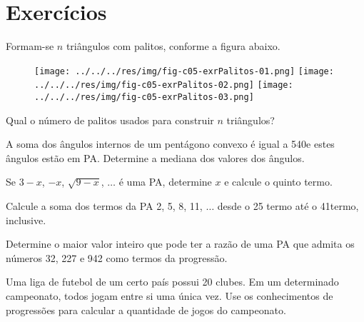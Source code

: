 \section{Exercícios}

\begin{exercise}
    Formam-se $n$ triângulos com palitos, conforme a figura abaixo.
\begin{center}

\begin{figure}[H]
    \center
    \texttt{[image: ../../../res/img/fig-c05-exrPalitos-01.png]}
    \texttt{[image: ../../../res/img/fig-c05-exrPalitos-02.png]}
    \texttt{[image: ../../../res/img/fig-c05-exrPalitos-03.png]}
\end{figure}

\end{center}
Qual o número de palitos usados para construir $n$ triângulos? 
\end{exercise}

\begin{exercise}
    A soma dos ângulos internos de um pentágono convexo é igual a
540\tdeg e estes ângulos estão em PA. Determine a mediana dos valores
dos ângulos.
\end{exercise}

\begin{exercise}
    Se $3-x$, $-x$, $\sqrt{9-x}$, $\dots$ é uma PA, determine $x$ e
calcule o quinto termo.
\end{exercise}

\begin{exercise}
    Calcule a soma dos termos da PA 2, 5, 8, 11, $\dots$ desde o 25\tdeg
termo até o 41\tdeg termo, inclusive.
\end{exercise}

\begin{exercise}
    Determine o maior valor inteiro que pode ter a razão de uma PA
que admita os números 32, 227 e 942 como termos da progressão.
\end{exercise}

\begin{exercise}
    Uma liga de futebol de um certo país possui 20 clubes. Em um determinado campeonato, todos jogam entre si uma única vez. Use os conhecimentos de progressões para calcular a quantidade de jogos do campeonato.
\end{exercise}

